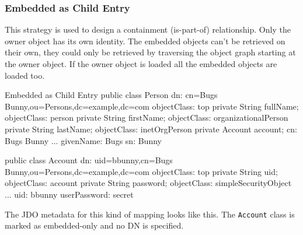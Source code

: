 \documentclass[a4paper,11pt,oneside]{article}
\begin{document}
\subsubsection{Embedded as Child Entry}
This strategy is used to design a containment (is-part-of) relationship. Only the owner object has its own identity. The embedded objects can't be retrieved on their own, they could only be retrieved by traversing the object graph starting at the owner object.  If the owner object is loaded all the embedded objects are loaded too.
\begin{SaveVerbatim}{Embedded as Child Entry}
public class Person                      dn: cn=Bugs Bunny,ou=Persons,dc=example,dc=com             
{                                        objectClass: top                                          
    private String fullName;             objectClass: person                                       
    private String firstName;            objectClass: organizationalPerson                         
    private String lastName;             objectClass: inetOrgPerson                                
    private Account account;             cn: Bugs Bunny                                                 
    ...                                  givenName: Bugs                                           
}                                        sn: Bunny     
                                            
public class Account                     dn: uid=bbunny,cn=Bugs Bunny,ou=Persons,dc=example,dc=com                                             
{                                        objectClass: top                                      
    private String uid;                  objectClass: account                                                            
    private String password;             objectClass: simpleSecurityObject                                                  
    ...                                  uid: bbunny                                                                
}                                        userPassword: secret                         
\end{SaveVerbatim}
\begin{figure}[htb]
\end{figure}
The JDO metadata for this kind of mapping looks like this. The \texttt{Account} class is marked as embedded-only and no DN is specified.
\end{document}
